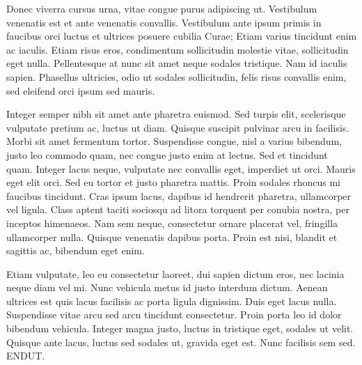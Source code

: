 \documentclass[12pt]{report}
\begin{document}
\begin{large}
Donec viverra cursus urna, vitae congue purus adipiscing ut.
Vestibulum venenatis est et ante venenatis convallis. Vestibulum ante
ipsum primis in faucibus orci luctus et ultrices posuere cubilia
Curae; Etiam varius tincidunt enim ac iaculis. Etiam risus eros,
condimentum sollicitudin molestie vitae, sollicitudin eget nulla.
Pellentesque at nunc sit amet neque sodales tristique. Nam id iaculis
sapien. Phasellus ultricies, odio ut sodales sollicitudin, felis risus
convallis enim, sed eleifend orci ipsum sed mauris.

Integer semper nibh sit amet ante pharetra euismod. Sed turpis elit,
scelerisque vulputate pretium ac, luctus ut diam. Quisque suscipit
pulvinar arcu in facilisis. Morbi sit amet fermentum tortor.
Suspendisse congue, nisl a varius bibendum, justo leo commodo quam,
nec congue justo enim at lectus. Sed et tincidunt quam. Integer lacus
neque, vulputate nec convallis eget, imperdiet ut orci. Mauris eget
elit orci. Sed eu tortor et justo pharetra mattis. Proin sodales
rhoncus mi faucibus tincidunt. Cras ipsum lacus, dapibus id hendrerit
pharetra, ullamcorper vel ligula. Class aptent taciti sociosqu ad
litora torquent per conubia nostra, per inceptos himenaeos. Nam sem
neque, consectetur ornare placerat vel, fringilla ullamcorper nulla.
Quisque venenatis dapibus porta. Proin est nisi, blandit et sagittis
ac, bibendum eget enim.

Etiam vulputate, leo eu consectetur laoreet, dui sapien dictum eros,
nec lacinia neque diam vel mi. Nunc vehicula metus id justo interdum
dictum. Aenean ultrices est quis lacus facilisis ac porta ligula
dignissim. Duis eget lacus nulla. Suspendisse vitae arcu sed arcu
tincidunt consectetur. Proin porta leo id dolor bibendum vehicula.
Integer magna justo, luctus in tristique eget, sodales ut velit.
Quisque ante lacus, luctus sed sodales ut, gravida eget est. Nunc
facilisis sem sed. ENDUT.

\end{large}
\end{document}
